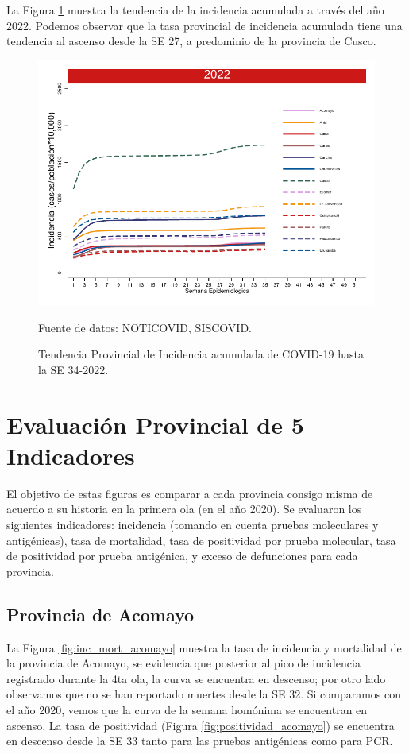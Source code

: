 \documentclass[12pt,a4paper,openany]{book}
\begin{document}
	La Figura \ref{fig:incidencia_provincial} muestra la tendencia de la incidencia acumulada a través del año 2022. Podemos observar que la tasa provincial de incidencia acumulada tiene una tendencia al ascenso desde la SE 27, a predominio de la provincia de Cusco.
	
	\begin{figure}[h]
		\caption{Tendencia Provincial de Incidencia acumulada de COVID-19 hasta la SE 34-2022. }\label{fig:incidencia_provincial}
		\begin{center}
			\includegraphics[width=0.60\linewidth]{../figuras/incidencia_provincial_acumulada_2022.pdf}
		\end{center}
		{\footnotesize {Fuente de datos: NOTICOVID, SISCOVID.}}
	\end{figure}
	
	\clearpage
	
	\section*{Evaluación Provincial de 5 Indicadores}
	\noindent El objetivo de estas figuras es comparar a cada provincia consigo misma de acuerdo a su historia  en la primera ola (en el año 2020). Se evaluaron los siguientes indicadores: incidencia (tomando en cuenta pruebas moleculares y antigénicas), tasa de mortalidad, tasa de positividad por prueba molecular, tasa de positividad por prueba antigénica, y exceso de defunciones para cada provincia.
	
	\subsection*{Provincia de Acomayo}
	\noindent La Figura \ref{fig:inc_mort_acomayo} muestra la tasa de incidencia y mortalidad de la provincia de Acomayo, se evidencia que posterior al pico de incidencia registrado durante la 4ta ola, la curva se encuentra en descenso; por otro lado observamos que no se han reportado muertes desde la SE 32. Si comparamos con el año 2020, vemos que la curva de la semana homónima se encuentran en ascenso. La tasa de positividad (Figura \ref{fig:positividad_acomayo}) se encuentra en descenso desde la SE 33 tanto para las pruebas antigénicas como para PCR. 
		
\end{document}
